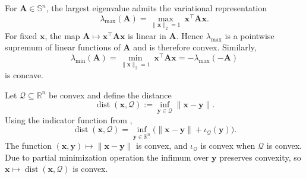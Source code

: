 \begin{example}
For $\mathbf{A}\in\mathbb{S}^n$, the largest eigenvalue admits the variational representation
\[
  \lambda_{\max}(\mathbf{A})=\max_{\|\mathbf{x}\|_2=1}\ \mathbf{x}^\top \mathbf{A}\mathbf{x}.
\]
For fixed $\mathbf{x}$, the map $\mathbf{A}\mapsto \mathbf{x}^\top \mathbf{A}\mathbf{x}$ is linear in $\mathbf{A}$.
Hence $\lambda_{\max}$ is a pointwise supremum of linear functions of $\mathbf{A}$ and is therefore convex.
Similarly,
\[
  \lambda_{\min}(\mathbf{A})=\min_{\|\mathbf{x}\|_2=1}\ \mathbf{x}^\top \mathbf{A}\mathbf{x}
  =-\lambda_{\max}(-\mathbf{A})
\]
is concave.
\end{example}

\begin{example}
Let $\mathcal{Q}\subseteq\mathbb{R}^n$ be convex and define the distance
\[
  \operatorname{dist}(\mathbf{x},\mathcal{Q}):=\inf_{\mathbf{y}\in\mathcal{Q}}\|\mathbf{x}-\mathbf{y}\|.
\]
Using the indicator function from ,
\[
  \operatorname{dist}(\mathbf{x},\mathcal{Q})
  =\inf_{\mathbf{y}\in\mathbb{R}^n}\bigl(\|\mathbf{x}-\mathbf{y}\|+\iota_{\mathcal{Q}}(\mathbf{y})\bigr).
\]
The function $(\mathbf{x},\mathbf{y})\mapsto \|\mathbf{x}-\mathbf{y}\|$ is convex, and $\iota_{\mathcal{Q}}$ is convex when $\mathcal{Q}$ is convex.
Due to partial minimization operation  the infimum over $\mathbf{y}$ preserves convexity, 
so $\mathbf{x}\mapsto\operatorname{dist}(\mathbf{x},\mathcal{Q})$ is convex.
\end{example}

